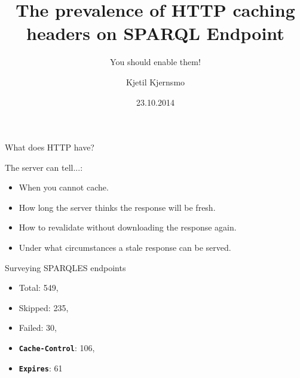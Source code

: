 \documentclass[english,usenames,dvipsnames,aspectratio=169]{beamer}
\begin{document}
\title[Enable caching!]{The prevalence of HTTP caching headers on SPARQL Endpoint}
\subtitle{You should enable them!}
\author{Kjetil Kjernsmo}
\date{23.10.2014}
\maketitle


\begin{frame}{What does HTTP have?}

The server can tell...:

\begin{itemize}

\item When you cannot cache.
\item How long the server thinks the response will be fresh.
\item How to revalidate without downloading the response again.
\item Under what circumstances a stale response can be served.
\end{itemize}

\end{frame}

\begin{frame}{Surveying SPARQLES endpoints}

\begin{itemize}

\item Total: 549,
\item Skipped: 235,
\item Failed: 30,
\item \textbf{\texttt{Cache-Control}}: 106,
\item \textbf{\texttt{Expires}}: 61

\end{itemize}

\end{frame}
\end{document}
